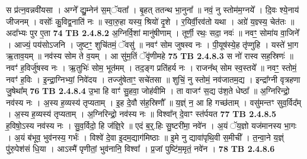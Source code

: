 \documentclass[17pt]{extarticle}
\begin{document}
                  स प्र॑त्न॒वन्नवी॑यसा । अग्ने᳚ द्यु॒म्नेन॑ स॒म्ॅयता᳚ । बृ॒हत् ततन्थ भा॒नुना᳚ ॥ नवं॒ नु स्तोम॑म॒ग्नये᳚ । दि॒वः श्ये॒नाय॑ जीजनम् । वसोः᳚ कु॒विद्व॒नाति॑ नः ॥ स्वा॒रु॒हा यस्य॒ श्रियो॑ दृ॒शे । र॒यिर्वी॒रव॑तो यथा । अग्रे॑ य॒ज्ञ्स्य॒ चेत॑तः ॥ अदा᳚भ्यः पुर ए॒ता \textbf{ 74} \newline
                  \newline
                                \textbf{ TB 2.4.8.2} \newline
                  अ॒ग्निर्वि॒शां मानु॑षीणाम् । तूर्णी॒ रथः॒ सदा॒ नवः॑ ॥ नवꣳ॒॒ सोमा॑य वा॒जिने᳚ । आज्यं॒ पय॑सोऽजनि । जुष्टꣳ॒॒ शुचि॑तमं॒ ॅवसु॑ ॥ नवꣳ॑ सोम जुषस्व नः । पी॒यूष॑स्ये॒ह तृ॑प्णुहि । यस्ते॑ भा॒ग ऋ॒ताव॒यम् ॥ नव॑स्य सोम ते व॒यम् । आ सु॑म॒तिं ॅवृ॑णीमहे \textbf{ 75} \newline
                  \newline
                                \textbf{ TB 2.4.8.3} \newline
                  स नो॑ रास्व सह॒स्रिणः॑ ॥ नवꣳ॑ ह॒विर्जु॑षस्व नः । ऋ॒तुभिः॑ सोम॒ भूत॑मम् । तद॒ङ्ग प्रति॑हर्य नः । राजन᳚थ् सोम स्व॒स्तये᳚ ॥ नवꣳ॒॒ स्तोमं॒ नवꣳ॑ ह॒विः । इ॒न्द्रा॒ग्निभ्यां॒ निवे॑दय । तज्जु॑षेताꣳ॒॒ सचे॑तसा ॥ शुचिं॒ नु स्तोमं॒ नव॑जातम॒द्य । इन्द्रा᳚ग्नी वृत्रहणा जु॒षेथा᳚म् \textbf{ 76} \newline
                  \newline
                                \textbf{ TB 2.4.8.4} \newline
                  उ॒भा हि वाꣳ॑ सु॒हवा॒ जोह॑वीमि । ता वाजꣳ॑ स॒द्य उ॑श॒ते धेष्ठा᳚ ॥ अ॒ग्निरिन्द्रो॒ नव॑स्य नः । अ॒स्य ह॒व्यस्य॑ तृप्यताम् । इ॒ह दे॒वौ स॑ह॒स्रिणौ᳚ ॥ य॒ज्ञ्ं न॒ आ हि गच्छ॑ताम् । वसु॑मन्तꣳ सुव॒र्विद᳚म् । अ॒स्य ह॒व्यस्य॑ तृप्यताम् । अ॒ग्निरिन्द्रो॒ नव॑स्य नः ॥ विश्वा᳚न् दे॒वाꣳ स्त॑र्पयत \textbf{ 77} \newline
                  \newline
                                \textbf{ TB 2.4.8.5} \newline
                  ह॒विषो॒ऽस्य नव॑स्य नः । सु॒व॒र्विदो॒ हि ज॑ज्ञि॒रे ॥ एदं ब॒र्॒.हिः सु॒ष्टरी॑मा॒ नवे॑न । अ॒यं ॅय॒ज्ञो यज॑मानस्य भा॒गः । अ॒यं ब॑भूव॒ भुव॑नस्य॒ गर्भः॑ । विश्वे॑ दे॒वा इ॒दम॒द्याग॑मिष्ठाः ॥ इ॒मे नु द्यावा॑पृथि॒वी स॒मीची᳚ । त॒न्वा॒ने य॒ज्ञ्ं पु॑रु॒पेश॑सं धि॒या । आऽस्मै॑ पृणीतां॒ भुव॑नानि॒ विश्वा᳚ । प्र॒जां पुष्टि॑म॒मृतं॒ नवे॑न । \textbf{ 78} \newline
                  \newline
                                \textbf{ TB 2.4.8.6} \newline
\end{document}
